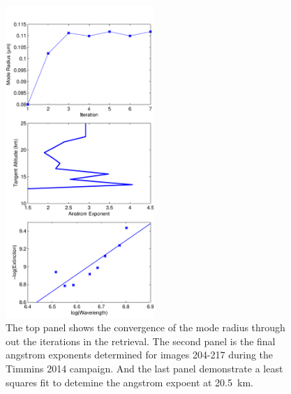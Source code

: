 \documentclass[12pt]{article}
\begin{document}
\begin{figure}
\includegraphics[width=0.5\textwidth]{./Images/ParticelSize.pdf}
    \caption[ALI Particle Size]{The top panel shows the convergence of the mode radius through out the iterations in the retrieval. The second panel is the final angstrom exponents determined for images 204-217 during the Timmins 2014 campaign. And the last panel demonstrate a least squares fit to detemine the angstrom expoent at 20.5~km.}
    \label{fig:ParticleSize}
\end{figure}
\end{document}
